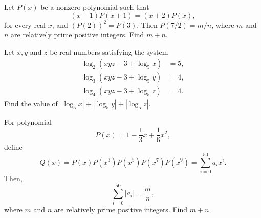 %	







\begin{question}[name={2016 AIME I, \href{https://artofproblemsolving.com/community/c4p5966192}{Problem 11}}]
	Let $P(x)$ be a nonzero polynomial such that $$(x-1)P(x+1)=(x+2)P(x),$$ for every real $x$, and $\left(P(2)\right)^2 = P(3)$. Then $P(7/2)={m}/{n}$, where $m$ and $n$ are relatively prime positive integers. Find $m + n$.
\end{question}


%	













\begin{question}[name={2016 AIME II, \href{https://artofproblemsolving.com/community/c4p6023524}{Problem 3}}]
	Let $x,y$ and $z$ be real numbers satisfying the system\begin{align*}
		\log_2(xyz-3+\log_5 x) &= 5, \\
		\log_3(xyz-3+\log_5 y) &= 4, \\
		\log_4(xyz-3+\log_5 z) &= 4.
	\end{align*}Find the value of $|\log_5 x|+|\log_5 y|+|\log_5 z|$.
\end{question}


%	







\begin{question}[name={2016 AIME II, \href{https://artofproblemsolving.com/community/c4p6023562}{Problem 6}}]
	For polynomial $$P(x)=1-\frac{1}{3}x+\frac{1}{6}x^2,$$ define\[ Q(x) = P(x)P(x^3)P(x^5)P(x^7)P(x^9) = \sum\limits_{i=0}^{50}a_ix^i. \]Then, $$\sum\limits_{i=0}^{50}|a_i|=\frac{m}{n},$$ where $m$ and $n$ are relatively prime positive integers. Find $m+n$.
\end{question}


